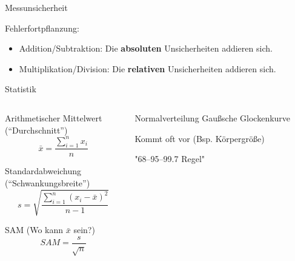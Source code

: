 \documentclass{beamer}
\begin{document}
\begin{frame}{Messunsicherheit}
\pause

Fehlerfortpflanzung:

\begin{itemize}
    \item 
    Addition/Subtraktion: Die \textbf{absoluten} Unsicherheiten addieren sich.
    \item
    Multiplikation/Division: Die \textbf{relativen} Unsicherheiten addieren sich. 
\end{itemize}




    
\end{frame}


\begin{frame}{Statistik}



\begin{columns}[c]

\begin{column}{5cm}

Arithmetischer Mittelwert \\ 
(``Durchschnitt'')
\[
\bar{x} =   \frac{\sum_{i=1}^n x_i}{n}
\]

Standardabweichung \\ 
(``Schwankungsbreite'')
\[
s = \sqrt{\frac{\sum_{i=1}^n (x_i-\bar{x})^2}{n-1}}
\]

SAM (Wo kann \(\bar{x}\) sein?)
\[
SAM = \frac{s}{\sqrt{n}}
\]


\end{column}

\pause
\begin{column}{6cm}

\begin{block}{Normalverteilung }
Gaußsche Glockenkurve

Kommt oft vor (Bsp. Körpergröße)

"68–95–99.7 Regel"


\end{block}
\end{column}
\end{columns}
\end{frame}
\end{document}
